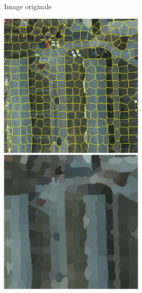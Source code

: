 \begin{figure}
\begin{subfigure}{\textwidth}
\begin{subfigure}{0.25\textwidth}
    \caption*{Image originale}
\end{subfigure}%
\begin{subfigure}{0.25\textwidth}
    \includegraphics[width=\textwidth]{Chapitre2/potsdam_slic}
    \includegraphics[width=\textwidth]{Chapitre2/potsdam_slic_patchwork}

\end{subfigure}
\end{subfigure}
\end{figure}
